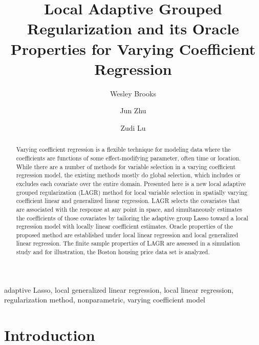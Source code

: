 \documentclass[authoryear,review, 12pt]{elsarticle}
\begin{document}
\begin{frontmatter}

\title{Local Adaptive Grouped Regularization and its Oracle Properties for Varying Coefficient Regression}


\author[wrbrooks]{Wesley Brooks}

\author[jzhu]{Jun Zhu}

\author[zlu]{Zudi Lu}

\address[wrbrooks]{Department of Statistics, University of Wisconsin, Madison, WI 53706}
\address[jzhu]{Department of Statistics and Department of Entomology, University of Wisconsin, Madison, WI 53706}
\address[zlu]{School of Mathematical Sciences, The University of Southampton, Highfield, Southampton UK}

\begin{abstract}
Varying coefficient regression is a flexible technique for modeling data where the coefficients are functions of some effect-modifying parameter, often time or location. While there are a number of methods for variable selection in a varying coefficient regression model, the existing methods mostly do global selection, which includes or excludes each covariate over the entire domain. Presented here is a new local adaptive grouped regularization (LAGR) method for local variable selection in spatially varying coefficient linear and generalized linear regression. LAGR selects the covariates that are associated with the response at any point in space, and simultaneously estimates the coefficients of those covariates by tailoring the adaptive group Lasso toward a local regression model with locally linear coefficient estimates. Oracle properties of the proposed method are established under local linear regression and local generalized linear regression. The finite sample properties of LAGR are assessed in a simulation study and for illustration, the Boston housing price data set is analyzed.
\end{abstract}

\begin{keyword}
adaptive Lasso, local generalized linear regression, local linear regression, regularization method, nonparametric, varying coefficient model
\end{keyword}

\end{frontmatter}

\section{Introduction}
\end{document}
